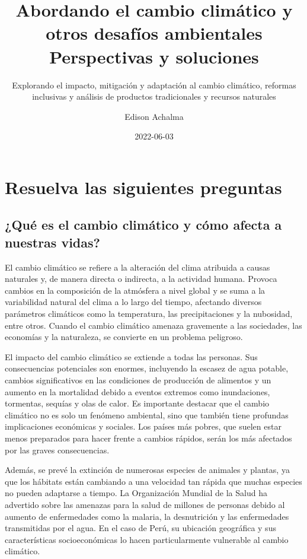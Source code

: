 \documentclass[
  letterpaper,
  DIV=11,
  numbers=noendperiod]{scrartcl}
\title{Abordando el cambio climático y otros desafíos ambientales
Perspectivas y soluciones}
\subtitle{Explorando el impacto, mitigación y adaptación al cambio
climático, reformas inclusivas y análisis de productos tradicionales y
recursos naturales}
\author{Edison Achalma}
\date{2022-06-03}
\begin{document}
\maketitle
\ifdefined\Shaded\renewenvironment{Shaded}{\begin{tcolorbox}[borderline west={3pt}{0pt}{shadecolor}, boxrule=0pt, frame hidden, breakable, sharp corners, interior hidden, enhanced]}{\end{tcolorbox}}\fi

\hypertarget{resuelva-las-siguientes-preguntas}{%
\section{Resuelva las siguientes
preguntas}\label{resuelva-las-siguientes-preguntas}}

\hypertarget{quuxe9-es-el-cambio-climuxe1tico-y-cuxf3mo-afecta-a-nuestras-vidas}{%
\subsection{¿Qué es el cambio climático y cómo afecta a nuestras
vidas?}\label{quuxe9-es-el-cambio-climuxe1tico-y-cuxf3mo-afecta-a-nuestras-vidas}}

El cambio climático se refiere a la alteración del clima atribuida a
causas naturales y, de manera directa o indirecta, a la actividad
humana. Provoca cambios en la composición de la atmósfera a nivel global
y se suma a la variabilidad natural del clima a lo largo del tiempo,
afectando diversos parámetros climáticos como la temperatura, las
precipitaciones y la nubosidad, entre otros. Cuando el cambio climático
amenaza gravemente a las sociedades, las economías y la naturaleza, se
convierte en un problema peligroso.

El impacto del cambio climático se extiende a todas las personas. Sus
consecuencias potenciales son enormes, incluyendo la escasez de agua
potable, cambios significativos en las condiciones de producción de
alimentos y un aumento en la mortalidad debido a eventos extremos como
inundaciones, tormentas, sequías y olas de calor. Es importante destacar
que el cambio climático no es solo un fenómeno ambiental, sino que
también tiene profundas implicaciones económicas y sociales. Los países
más pobres, que suelen estar menos preparados para hacer frente a
cambios rápidos, serán los más afectados por las graves consecuencias.

Además, se prevé la extinción de numerosas especies de animales y
plantas, ya que los hábitats están cambiando a una velocidad tan rápida
que muchas especies no pueden adaptarse a tiempo. La Organización
Mundial de la Salud ha advertido sobre las amenazas para la salud de
millones de personas debido al aumento de enfermedades como la malaria,
la desnutrición y las enfermedades transmitidas por el agua. En el caso
de Perú, su ubicación geográfica y sus características socioeconómicas
lo hacen particularmente vulnerable al cambio climático.
\end{document}
